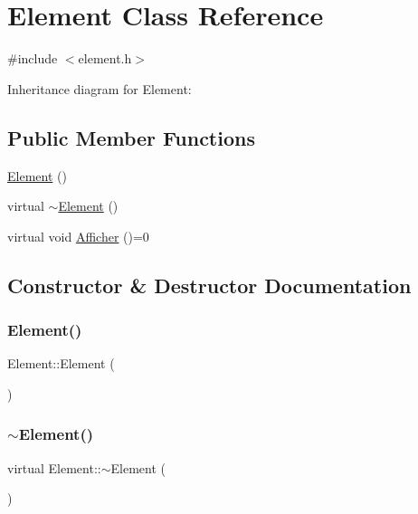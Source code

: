 \hypertarget{class_element}{}\section{Element Class Reference}
\label{class_element}


{\ttfamily \#include $<$element.\+h$>$}



Inheritance diagram for Element\+:
\subsection*{Public Member Functions}
\begin{DoxyCompactItemize}
\item 
\hyperlink{class_element_ab0d0e20be9a36ae676202db753faeec9}{Element} ()
\item 
virtual \hyperlink{class_element_ab4fc182292f44e46acba9c55662237bf}{$\sim$\+Element} ()
\item 
virtual void \hyperlink{class_element_aa6fe26841512814e1e838c14c692daf0}{Afficher} ()=0
\end{DoxyCompactItemize}


\subsection{Constructor \& Destructor Documentation}
\mbox{\label{class_element_ab0d0e20be9a36ae676202db753faeec9}} 
\subsubsection{\texorpdfstring{Element()}{Element()}}
{\footnotesize\ttfamily Element\+::\+Element (\begin{DoxyParamCaption}{ }\end{DoxyParamCaption})}

\mbox{\label{class_element_ab4fc182292f44e46acba9c55662237bf}} 
\subsubsection{\texorpdfstring{$\sim$\+Element()}{~Element()}}
{\footnotesize\ttfamily virtual Element\+::$\sim$\+Element (\begin{DoxyParamCaption}{ }\end{DoxyParamCaption})\hspace{0.3cm}{\ttfamily [virtual]}}



